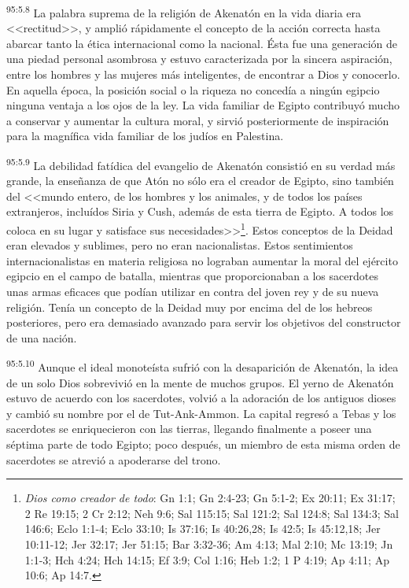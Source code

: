 \par
\textsuperscript{95:5.8} La palabra suprema de la religión de Akenatón en la vida diaria era <<rectitud>>, y amplió rápidamente el concepto de la acción correcta hasta abarcar tanto la ética internacional como la nacional. Ésta fue una generación de una piedad personal asombrosa y estuvo caracterizada por la sincera aspiración, entre los hombres y las mujeres más inteligentes, de encontrar a Dios y conocerlo. En aquella época, la posición social o la riqueza no concedía a ningún egipcio ninguna ventaja a los ojos de la ley. La vida familiar de Egipto contribuyó mucho a conservar y aumentar la cultura moral, y sirvió posteriormente de inspiración para la magnífica vida familiar de los judíos en Palestina.

\par
\textsuperscript{95:5.9} La debilidad fatídica del evangelio de Akenatón consistió en su verdad más grande, la enseñanza de que Atón no sólo era el creador de Egipto, sino también del <<mundo entero, de los hombres y los animales, y de todos los países extranjeros, incluídos Siria y Cush, además de esta tierra de Egipto. A todos los coloca en su lugar y satisface sus necesidades>>\footnote{\textit{Dios como creador de todo}: Gn 1:1; Gn 2:4-23; Gn 5:1-2; Ex 20:11; Ex 31:17; 2 Re 19:15; 2 Cr 2:12; Neh 9:6; Sal 115:15; Sal 121:2; Sal 124:8; Sal 134:3; Sal 146:6; Eclo 1:1-4; Eclo 33:10; Is 37:16; Is 40:26,28; Is 42:5; Is 45:12,18; Jer 10:11-12; Jer 32:17; Jer 51:15; Bar 3:32-36; Am 4:13; Mal 2:10; Mc 13:19; Jn 1:1-3; Hch 4:24; Hch 14:15; Ef 3:9; Col 1:16; Heb 1:2; 1 P 4:19; Ap 4:11; Ap 10:6; Ap 14:7.}. Estos conceptos de la Deidad eran elevados y sublimes, pero no eran nacionalistas. Estos sentimientos internacionalistas en materia religiosa no lograban aumentar la moral del ejército egipcio en el campo de batalla, mientras que proporcionaban a los sacerdotes unas armas eficaces que podían utilizar en contra del joven rey y de su nueva religión. Tenía un concepto de la Deidad muy por encima del de los hebreos posteriores, pero era demasiado avanzado para servir los objetivos del constructor de una nación.

\par
\textsuperscript{95:5.10} Aunque el ideal monoteísta sufrió con la desaparición de Akenatón, la idea de un solo Dios sobrevivió en la mente de muchos grupos. El yerno de Akenatón estuvo de acuerdo con los sacerdotes, volvió a la adoración de los antiguos dioses y cambió su nombre por el de Tut-Ank-Ammon. La capital regresó a Tebas y los sacerdotes se enriquecieron con las tierras, llegando finalmente a poseer una séptima parte de todo Egipto; poco después, un miembro de esta misma orden de sacerdotes se atrevió a apoderarse del trono.

